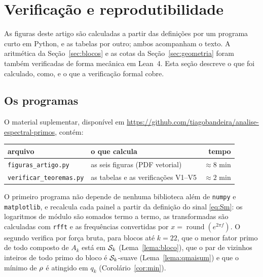 \section{Verificação e reprodutibilidade}\label{sec:verificacao}

As figuras deste artigo são calculadas a partir das definições por um programa
curto em Python, e as tabelas por outro; ambos acompanham o texto. A aritmética da
Seção~\ref{sec:blocos} e as cotas da Seção~\ref{sec:geometria} foram também
verificadas de forma mecânica em Lean~4. Esta seção descreve o que foi calculado,
como, e o que a verificação formal cobre.

\subsection{Os programas}

\begin{sloppypar}
O material suplementar, disponível em
\url{https://github.com/tiagobandeira/analise-espectral-primos}, contém:
\end{sloppypar}

\begin{center}
\footnotesize
\begin{tabular}{llr}
\toprule
arquivo & o que calcula & tempo \\
\midrule
\texttt{figuras\_artigo.py} & as seis figuras (PDF vetorial) & $\approx 8$ min \\
\texttt{verificar\_teoremas.py} & as tabelas e as verificações V1--V5 & $\approx 2$ min \\
\bottomrule
\end{tabular}
\end{center}

O primeiro programa não depende de nenhuma biblioteca além de \texttt{numpy} e
\texttt{matplotlib}, e recalcula cada painel a partir da definição do sinal
\eqref{eq:Sm}: os logaritmos de módulo são somados termo a termo, as transformadas
são calculadas com \texttt{rfft} e as frequências convertidas por
$x=\operatorname{round}(e^{2\pi f})$. O segundo verifica por força bruta, para
blocos até $k=22$, que o menor fator primo de todo composto de $A_k$ está em
$\mathcal{S}_k$ (Lema~\ref{lema:bloco}), que o par de vizinhos inteiros de todo primo do
bloco é $\mathcal{S}_k$-suave (Lema~\ref{lema:qmaisum}) e que o mínimo de $\rho$ é
atingido em $q_k$ (Corolário~\ref{cor:min}).

